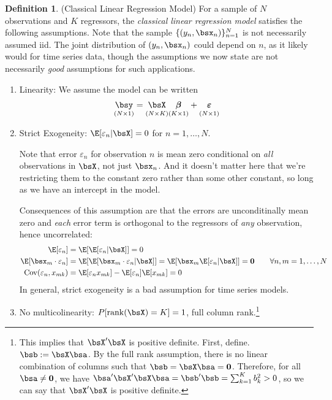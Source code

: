 \documentclass[12pt]{article}
\theoremstyle{plain}
\theoremstyle{definition}
\newtheorem{defn}[thm]{Definition}
\theoremstyle{remark}
\newcommand{\bsvarepsilon}{\boldsymbol{\varepsilon}}
\newcommand{\bsbeta}{\boldsymbol{\beta}}
\renewcommand{\bso}{\boldsymbol{0}}
\newcommand{\Cov}{\operatorname{Cov}}
\newcommand{\rank}{\operatorname{rank}}
\newcommand{\nN}{_{n=1}^N}
\begin{document}
\begin{defn}(Classical Linear Regression Model)
For a sample of $N$ observations and $K$ regressors, the
\emph{classical linear regression model} satisfies the following
assumptions. Note that the sample $\{(y_n,\bsx_n)\}\nN$ is not
necessarily assumed iid. The joint distribution of $(y_n,\bsx_n)$ could
depend on $n$, as it likely would for time series data, though the
assumptions we now state are not necessarily \emph{good} assumptions for
such applications.
\begin{enumerate}
  \item Linearity: We assume the model can be written
    \begin{align}
      \underset{(N\times 1)}{\bsy}
      =
      \underset{(N\times K)}{\vphantom{\bsy} \bsX}
      \underset{(K\times 1)}{\vphantom{\bsy} \bsbeta}
      + \underset{(N\times 1)}{\vphantom{\bsy} \bsvarepsilon}
      \label{regyx}
    \end{align}
  \item Strict Exogeneity: $\E[\varepsilon_n |\bsX]=0$ for
    $n=1,\ldots,N$.

    Note that error $\varepsilon_n$ for observation $n$ is
    mean zero conditional on \emph{all} observations in $\bsX$, not just
    $\bsx_n$.
    And it doesn't matter here that we're restricting them to the
    constant zero rather than some other constant, so long as we have an
    intercept in the model.

    Consequences of this assumption are that the errors are
    unconditinally mean zero and \emph{each} error term is orthogonal to
    the regressors of \emph{any} observation, hence uncorrelated:
    \begin{align*}
      \E[\varepsilon_n] &= \E[\E[\varepsilon_n|\bsX]] = 0 \\
      \E[\bsx_m \cdot \varepsilon_n] &=
      \E[\E[\bsx_m \cdot \varepsilon_n|\bsX]] =
      \E[\bsx_m\E[ \varepsilon_n|\bsX]] = \bso
      \qquad \forall n,m = 1,\ldots,N \\
      \Cov(\varepsilon_n, x_{mk})
      &=
      \E[\varepsilon_n x_{mk}] - \E[\varepsilon_n]\E[x_{mk}] = 0
    \end{align*}
    In general, strict exogeneity is a bad assumption for time series
    models.

  \item No multicolinearity: $P[\rank(\bsX)=K]=1$, full column
    rank.\footnote{%
      This implies that $\bsX'\bsX$ is positive definite. First, define.
      $\bsb:=\bsX \bsa$. By the full rank assumption, there is no linear
      combination of columns such that $\bsb=\bsX\bsa = \bso$.
      Therefore, for all $\bsa\neq \bso$, we have
      $\bsa'\bsX'\bsX\bsa=\bsb'\bsb = \sum_{k=1}^K b_k^2 > 0$, so we can
      say that $\bsX'\bsX$ is positive definite.
    }


\end{enumerate}
\end{defn}
\end{document}
